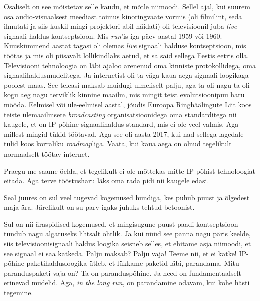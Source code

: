 Osaliselt on see mõistetav selle kaudu, et mõtle niimoodi. Sellel ajal, kui 
suurem osa audio-visuaalsest meediast toimus kinoringvaate vormis (oli 
filmilint, seda ilmutati ja siis kuskil mingi projektori abil näidati) oli  
televisioonil juba \emph{live}  signaali haldus kontseptsioon. Mis 
\emph{run}'is  iga päev aastal 1959 või 1960.  Kuuskümmend aastat tagasi oli 
olemas \emph{live} signaali halduse kontseptsioon, mis töötas ja mis oli 
piisavalt lollikindlaks  aetud, et sa said sellega Eestis eetris olla.  
Televisiooni tehnoloogia on läbi ajaloo arenenud oma kinniste protokollidega, 
oma signaalihaldusmudelitega. Ja internetist oli ta väga kaua aega signaali 
loogikaga poolest  maas. See teleasi maksab muidugi ulmeliselt palju, aga ta 
oli nagu ta oli kogu aeg nagu terviklik kinnine maailm, mis  mingit teist 
evolutsioonipuu haru mööda. Eelmisel või üle-eelmisel aastal,  jõudis Euroopa 
Ringhäälingute Liit koos teiste ülemaailmsete \emph{broadcasting} 
organisatsioonidega  oma standarditega nii kaugele, et on IP-põhine 
signaalihaldus standard, mis ei ole veel valmis. Aga millest mingid tükid 
töötavad.  Aga see oli aasta 2017, kui nad sellega lagedale tulid koos 
korraliku \emph{roadmap}'iga. Vaata, kui kaua aega on olnud tegelikult 
normaalselt töötav internet.

Praegu me saame öelda, et tegelikult ei ole mõttekas mitte IP-põhist 
tehnoloogiat eitada. Aga  terve tööstusharu läks oma rada pidi nii kaugele 
edasi.


Seal juures on sul veel tugevad kogemused hundiga, kes puhub puust ja õlgedest 
maja ära. Järelikult on su parv igaks juhuks tehtud betoonist. 

Sul on nii äraspidised kogemused, et mingisugune puust paadi kontseptsioon 
tundub nagu algatuseks lihtsalt  ohtlik. Ja kui nüüd see panna nagu päris 
keelde, siis televisioonisignaali haldus loogika seisneb selles, et ehitame 
asja niimoodi, et see signaal ei saa katkeda. Palju maksab? Palju vaja! Teeme 
nii, et ei katke! IP-põhine paketihaldusloogika ütleb, et lükkame paketid läbi, 
parandama. Mitu paranduspaketi vaja on? Ta on paranduspõhine. Ja need on 
fundamentaalselt erinevad mudelid. Aga,  \emph{in the long run}, on parandamine 
odavam, kui kohe hästi tegemine.
